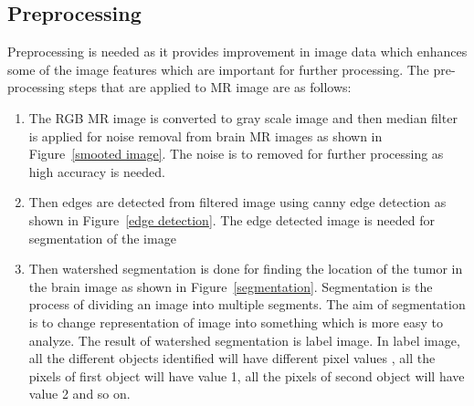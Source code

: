 \documentclass[11pt]{article}
\begin{document}
	\subsection{Preprocessing}%
	\label{sub:Preprocessing}

	Preprocessing is needed as it provides improvement
	in image data which  enhances some of the image features which are important
	for further processing. The  pre-processing steps that are applied to MR
	image are as follows:

	\begin{enumerate}
		\item The  RGB  MR    image  is  converted  to  gray  scale image  and
			then  median  filter  is  applied  for  noise  removal from brain MR
			images as shown in Figure~\ref{smooted image}. The noise is to removed for further
			processing as high accuracy is needed.

		\item Then  edges  are  detected  from  filtered  image  using canny
			edge  detection  as  shown  in  Figure~\ref{edge detection}.  The  edge detected
			image is needed for segmentation of  the image

		\item Then  watershed  segmentation  is  done  for  finding the
			location  of  the  tumor  in  the  brain  image  as  shown  in
			Figure~\ref{segmentation}. Segmentation is  the process of dividing  an image into
			multiple segments. The aim of segmentation is to change
			representation  of    image  into  something  which  is more  easy
			to  analyze.  The result  of  watershed  segmentation is  label
			image.    In  label  image,  all  the  different  objects identified
			will  have  different  pixel  values  ,  all  the  pixels  of first
			object  will have value 1, all the pixels of second object will have
			value 2 and so on.
	\end{enumerate}
\end{document}
